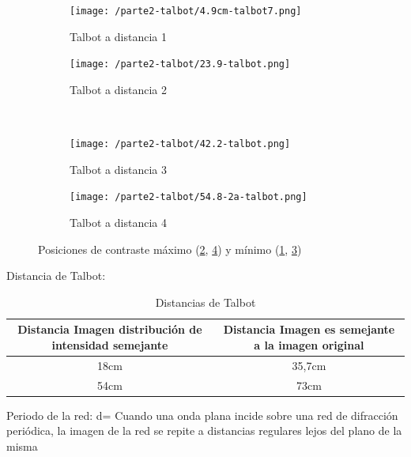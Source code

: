 \documentclass{./packages/optica-article}
\begin{document}
\begin{figure}[hptb]
\begin{center}
    \begin{subfigure}[t]{0.45\textwidth}\centering
        \texttt{[image: /parte2-talbot/4.9cm-talbot7.png]}
        \caption{ Talbot a distancia 1}
        \label{fig:talbot1}	
    \end{subfigure}
	\hfill
	\begin{subfigure}[t]{0.45\textwidth}\centering
		\texttt{[image: /parte2-talbot/23.9-talbot.png]}
        \caption{Talbot a distancia 2}
        \label{fig:talbot2}
	\end{subfigure}
	\\
	\begin{subfigure}[t]{0.45\textwidth}\centering
		\texttt{[image: /parte2-talbot/42.2-talbot.png]}
        \caption{ Talbot a distancia 3}
        \label{fig:talbot3}
	\end{subfigure}
	\hfill
	\begin{subfigure}[t]{0.45\textwidth}\centering
		\texttt{[image: /parte2-talbot/54.8-2a-talbot.png]}
        \caption{ Talbot a distancia 4}
        \label{fig:talbot4}
	\end{subfigure}
	
\caption{Posiciones de contraste máximo (\ref{fig:talbot2}, \ref{fig:talbot4}) y mínimo (\ref{fig:talbot1}, \ref{fig:talbot3})%
	}
	\label{fig:alltalbot}
\end{center}
\end{figure}

Distancia de Talbot: 

\begin{table}[h] %
        \centering
        \begin{tabular}{|c|c|}
            \hline
            Distancia Imagen distribución de intensidad semejante & Distancia Imagen es semejante a la imagen original\\
            \hline
            18cm & 35,7cm\\
            \hline
            54cm & 73cm \\
            \hline
        \end{tabular}
        \caption{Distancias de Talbot}
        \label{tab:dtalbot}
    \end{table}
Periodo de la red:
d=
Cuando una onda plana incide sobre una red de difracción periódica, la imagen de la red se repite a distancias regulares lejos del plano de la misma
\end{document}
